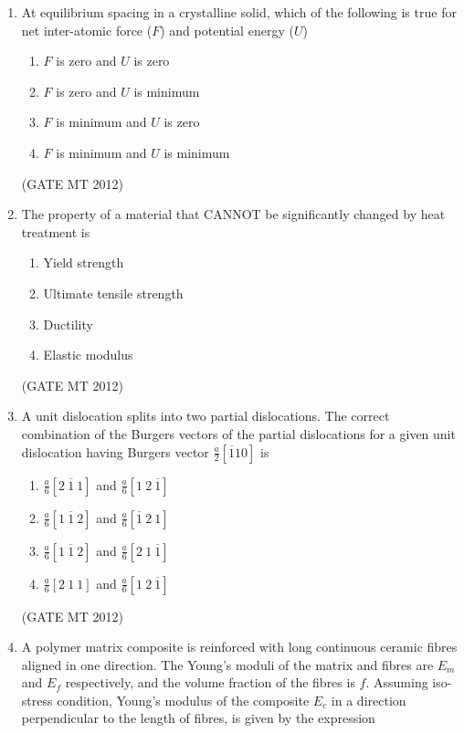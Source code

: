 \documentclass[journal, 11pt, onecolumn]{IEEEtran}
\theoremstyle{remark}
\begin{document}
\begin{enumerate}
\item At equilibrium spacing in a crystalline solid, which of the following is true for net inter-atomic force ($F$) and potential energy ($U$)  
\begin{multicols}{2}
\begin{enumerate}  
\item $F$ is zero and $U$ is zero
\item $F$ is zero and $U$ is minimum
\item $F$ is minimum and $U$ is zero
\item $F$ is minimum and $U$ is minimum
\end{enumerate}
\end{multicols}
\hfill(GATE MT 2012)
 

\item The property of a material that CANNOT be significantly changed by heat treatment is  
\begin{multicols}{2}
\begin{enumerate}  
\item Yield strength
\item Ultimate tensile strength
\item Ductility
\item Elastic modulus
\end{enumerate}
\end{multicols}
\hfill(GATE MT 2012)

\item A unit dislocation splits into two partial dislocations. The correct combination of the Burgers vectors of the partial dislocations for a given unit dislocation having Burgers vector \( \frac{a}{2}[\overline{1}10] \) is

\begin{multicols}{2}
\begin{enumerate}  
\item \( \frac{a}{6} [2\ \overline{1}\ 1] \) and \( \frac{a}{6} [1\ 2\ \overline{1}] \)
\item \( \frac{a}{6} [1\ \overline{1}\ 2] \) and \( \frac{a}{6} [\overline{1}\ 2\ 1] \)
\item \( \frac{a}{6} [1\ \overline{1}\ 2] \) and \( \frac{a}{6} [2\ 1\ \overline{1}] \)
\item \( \frac{a}{6} [2\ 1\ 1] \) and \( \frac{a}{6} [1\ 2\ \overline{1}] \)
\end{enumerate}
\end{multicols}
\hfill(GATE MT 2012)


\item A polymer matrix composite is reinforced with long continuous ceramic fibres aligned in one direction. The Young's moduli of the matrix and fibres are \(E_m\) and \(E_f\) respectively, and the volume fraction of the fibres is \(f\). Assuming iso-stress condition, Young's modulus of the composite \(E_c\) in a direction perpendicular to the length of fibres, is given by the expression


\end{enumerate}
\end{document}
